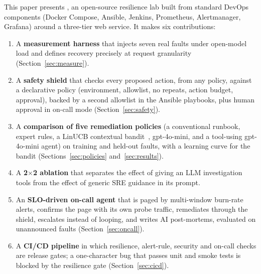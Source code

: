 This paper presents \sys{}, an open-source resilience lab built from standard DevOps components
(Docker Compose, Ansible, Jenkins, Prometheus, Alertmanager, Grafana) around a three-tier web
service. It makes six contributions:
\begin{enumerate}
\item A \textbf{measurement harness} that injects seven real faults under open-model load and
  defines recovery precisely at request granularity (Section~\ref{sec:measure}).
\item A \textbf{safety shield} that checks every proposed action, from any policy, against a
  declarative policy (environment, allowlist, no repeats, action budget, approval), backed by a
  second allowlist in the Ansible playbooks, plus human approval in on-call mode
  (Section~\ref{sec:safety}).
\item A \textbf{comparison of five remediation policies} (a conventional runbook, expert rules, a
  LinUCB contextual bandit~\cite{li2010linucb}, gpt-4o-mini, and a tool-using gpt-4o-mini agent)
  on training and held-out faults, with a learning curve for the bandit (Sections~\ref{sec:policies}
  and~\ref{sec:results}).
\item A \textbf{2$\times$2 ablation} that separates the effect of giving an LLM investigation tools
  from the effect of generic SRE guidance in its prompt.
\item An \textbf{SLO-driven on-call agent} that is paged by multi-window burn-rate alerts,
  confirms the page with its own probe traffic, remediates through the shield, escalates instead of
  looping, and writes AI post-mortems, evaluated on unannounced faults (Section~\ref{sec:oncall}).
\item A \textbf{CI/CD pipeline} in which resilience, alert-rule, security and on-call checks are
  release gates; a one-character bug that passes unit and smoke tests is blocked by the resilience
  gate (Section~\ref{sec:cicd}).
\end{enumerate}
